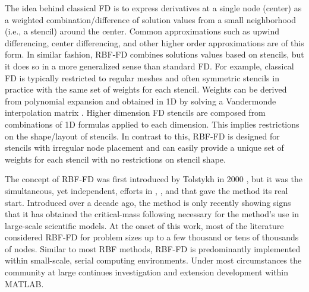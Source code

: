 \documentclass[11pt]{report}
\begin{document}
{The idea behind classical FD is to express derivatives at a single node (center) as a weighted combination/difference of solution values from a small neighborhood (i.e., a stencil) around the center. Common approximations such as upwind differencing, center differencing, and other higher order approximations are of this form. 
In similar fashion, RBF-FD combines solutions values based on stencils, but it does so in a more generalized sense than standard FD. For example, classical FD is typically restricted to regular meshes and often symmetric stencils in practice with the same set of weights for each stencil. Weights can be derived from polynomial expansion and obtained in 1D by solving a Vandermonde interpolation matrix \cite{FornbergLehto11}. Higher dimension FD stencils are composed from combinations of 1D formulas applied to each dimension. This implies restrictions on the shape/layout of stencils. In contrast to this, RBF-FD is designed for stencils with irregular node placement and can easily provide a unique set of weights for each stencil with no restrictions on stencil shape. 


The concept of RBF-FD was first introduced by Tolstykh in 2000 \cite{Tolstykh2000}, 
but it was the simultaneous, yet independent,
efforts in \cite{Shu2003}, \cite{Tolstykh2003a}, \cite{Wright2003} and \cite{Cecil2004} that gave the method its real start. Introduced over a decade ago, the method is only recently showing signs that it has obtained the critical-mass following necessary for the method's use in large-scale scientific models. At the onset of this work, most of the literature considered RBF-FD for problem sizes up to a few thousand or tens of thousands of nodes. Similar to most RBF methods, RBF-FD is predominantly implemented within small-scale, serial computing environments. Under most circumstances the community at large continues investigation and extension development within MATLAB. 

}
\end{document}
